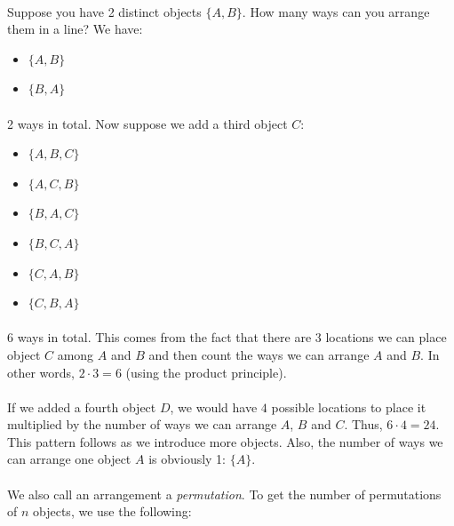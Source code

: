 \documentclass[12pt, a4paper, titlepage, twoside]{article}
\begin{document}
	\paragraph{}
	Suppose you have 2 distinct objects $\{A,B\}$. How many ways can you arrange them in a line? We have:
	
	\begin{itemize}
		\item $\{A, B\}$
		\item $\{B, A\}$
	\end{itemize}		
	
	\paragraph{}
	2 ways in total. Now suppose we add a third object $C$:
	
	\begin{itemize}
		\item $\{A,B,C\}$
		\item $\{A,C,B\}$
		\item $\{B,A,C\}$
		\item $\{B,C,A\}$
		\item $\{C,A,B\}$
		\item $\{C,B,A\}$
	\end{itemize}
	
	\paragraph{}
	6 ways in total. This comes from the fact that there are 3 locations we can place object $C$ among $A$ and $B$ and then
	count the ways we can arrange $A$ and $B$. In other words, $2 \cdot 3 = 6$ (using the product principle).
	
	\paragraph{}
	If we added a fourth object $D$, we would have $4$ possible locations to place it multiplied by the number of ways we can
	arrange $A$, $B$ and $C$. Thus, $6 \cdot 4 = 24$. This pattern follows as we introduce more objects. Also, the number of
	ways we can arrange one object $A$ is obviously 1: $\{A\}$.
	
	\paragraph{}
	We also call an arrangement a \textit{permutation}. To get the number of permutations of $n$ objects, we use the following:\\
	
\end{document}
